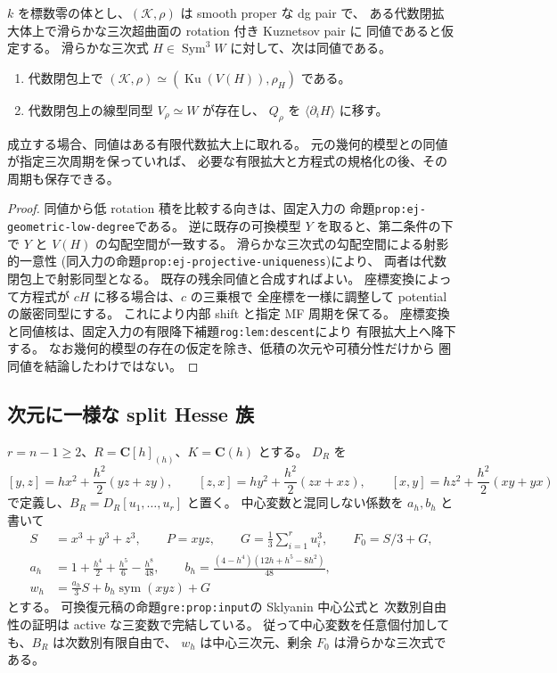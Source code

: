 \begin{proposition}[既知の可換模型がある場合の比較判定]
\label{prop:nfm-residual-low-product-test}
$k$ を標数零の体とし、$(\mathcal K,\rho)$ は smooth proper な dg pair で、
ある代数閉拡大体上で滑らかな三次超曲面の rotation 付き Kuznetsov pair に
同値であると仮定する。
滑らかな三次式 $H\in\operatorname{Sym}^3W$ に対して、次は同値である。
\begin{enumerate}
\item 代数閉包上で $(\mathcal K,\rho)\simeq(\operatorname{Ku}(V(H)),\rho_H)$ である。
\item 代数閉包上の線型同型 $V_\rho\simeq W$ が存在し、
$Q_\rho$ を $\langle\partial_iH\rangle$ に移す。
\end{enumerate}
成立する場合、同値はある有限代数拡大上に取れる。
元の幾何的模型との同値が指定三次周期を保っていれば、
必要な有限拡大と方程式の規格化の後、その周期も保存できる。
\end{proposition}

\begin{proof}
同値から低 rotation 積を比較する向きは、固定入力の
命題\texttt{prop:ej-geometric-low-degree}である。
逆に既存の可換模型 $Y$ を取ると、第二条件の下で $Y$ と $V(H)$ の勾配空間が一致する。
滑らかな三次式の勾配空間による射影的一意性
\textup{(}同入力の命題\texttt{prop:ej-projective-uniqueness}\textup{)}により、
両者は代数閉包上で射影同型となる。
既存の残余同値と合成すればよい。
座標変換によって方程式が $cH$ に移る場合は、$c$ の三乗根で
全座標を一様に調整して potential の厳密同型にする。
これにより内部 shift と指定 MF 周期を保てる。
座標変換と同値核は、固定入力の有限降下補題\texttt{rog:lem:descent}により
有限拡大上へ降下する。
なお幾何的模型の存在の仮定を除き、低積の次元や可積分性だけから
圏同値を結論したわけではない。
\end{proof}

\subsection{次元に一様な split Hesse 族}

$r=n-1\ge2$、$R=\mathbf C[h]_{(h)}$、$K=\mathbf C(h)$ とする。
$D_R$ を
\[
 [y,z]=h x^2+\frac{h^2}{2}(yz+zy),\qquad
 [z,x]=h y^2+\frac{h^2}{2}(zx+xz),\qquad
 [x,y]=h z^2+\frac{h^2}{2}(xy+yx)
\]
で定義し、$B_R=D_R[u_1,\ldots,u_r]$ と置く。
中心変数と混同しない係数を $a_h,b_h$ と書いて
\[
 \begin{split}
 S&=x^3+y^3+z^3,\qquad P=xyz,\qquad
 G=\frac13\sum_{i=1}^r u_i^3,\qquad F_0=S/3+G,\\
 a_h&=1+\frac{h^4}{2}+\frac{h^5}{6}-\frac{h^8}{48},\qquad
 b_h=\frac{(4-h^4)(12h+h^5-8h^2)}{48},\\
 w_h&=\frac{a_h}{3}S+b_h\operatorname{sym}(xyz)+G
 \end{split}
\]
とする。
可換復元稿の命題\texttt{gre:prop:input}の Sklyanin 中心公式と
次数別自由性の証明は active な三変数で完結している。
従って中心変数を任意個付加しても、$B_R$ は次数別有限自由で、
$w_h$ は中心三次元、剰余 $F_0$ は滑らかな三次式である。

